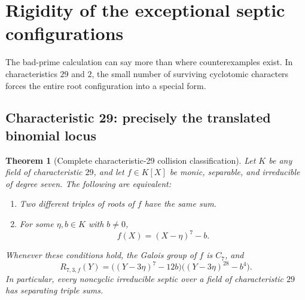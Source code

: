\documentclass[11pt,a4paper]{article}
\newtheorem{theorem}{Theorem}[section]
\theoremstyle{definition}
\theoremstyle{remark}
\begin{document}
\section{Rigidity of the exceptional septic configurations}
\label{rss:sec:rigidity}

The bad-prime calculation can say more than where counterexamples exist.
In characteristics $29$ and $2$, the small number of surviving cyclotomic
characters forces the entire root configuration into a special form.

\subsection{Characteristic 29: precisely the translated binomial locus}

\begin{theorem}[Complete characteristic-29 collision classification]
\label{rss:thm:29rigidity}
Let $K$ be any field of characteristic $29$, and let $f\in K[X]$ be monic,
separable, and irreducible of degree seven. The following are equivalent:
\begin{enumerate}[label=(\roman*)]
\item Two different triples of roots of $f$ have the same sum.
\item For some $\eta,b\in K$ with $b\neq0$,
\[
 f(X)=(X-\eta)^7-b.
\]
\end{enumerate}
Whenever these conditions hold, the Galois group of $f$ is $C_7$, and
\begin{equation}
 R_{7,3,f}(Y)=
 \bigl((Y-3\eta)^7-12b\bigr)
 \bigl((Y-3\eta)^{28}-b^4\bigr).
 \label{rss:eq:29rigidfactor}
\end{equation}
In particular, every noncyclic irreducible septic over a field of
characteristic $29$ has separating triple sums.
\end{theorem}
\end{document}
